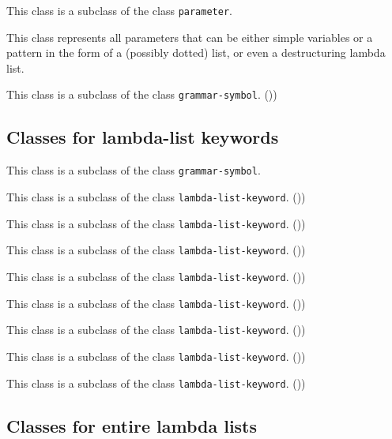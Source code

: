 This class is a subclass of the class \texttt{parameter}.


This class represents all parameters that can be either simple
variables or a pattern in the form of a (possibly dotted) list, or
even a destructuring lambda list.

This class is a subclass of the class \texttt{grammar-symbol}. ())

\subsection{Classes for lambda-list keywords}


This class is a subclass of the class \texttt{grammar-symbol}.


This class is a subclass of the class \texttt{lambda-list-keyword}. ())


This class is a subclass of the class \texttt{lambda-list-keyword}. ())


This class is a subclass of the class \texttt{lambda-list-keyword}. ())


This class is a subclass of the class \texttt{lambda-list-keyword}. ())


This class is a subclass of the class \texttt{lambda-list-keyword}. ())


This class is a subclass of the class \texttt{lambda-list-keyword}. ())


This class is a subclass of the class \texttt{lambda-list-keyword}. ())


This class is a subclass of the class \texttt{lambda-list-keyword}. ())

\subsection{Classes for entire lambda lists}


